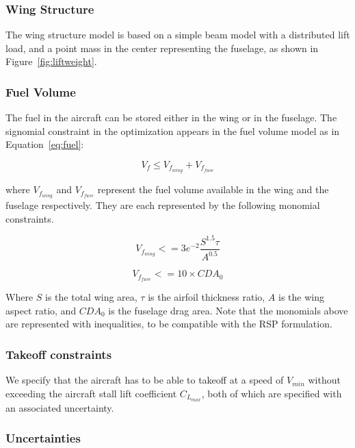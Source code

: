 \subsubsection{Wing Structure}
The wing structure model is based on a simple beam model with a distributed lift load,
and a point mass in the center representing the fuselage, as shown in Figure~\ref{fig:liftweight}.

\subsubsection{Fuel Volume}
The fuel in the aircraft can be stored either in the wing or in the fuselage.
The signomial constraint in the optimization appears in the fuel volume model as in Equation~\ref{eq:fuel}:

\begin{equation}
\label{eq:fuel}
V_f \leq V_{f_{wing}} + V_{f_{fuse}} 
\end{equation}

where $V_{f_{wing}}$ and $V_{f_{fuse}}$ represent the fuel volume available in the wing
and the fuselage respectively. They are each represented by the following monomial constraints.

\begin{equation}
\label{eq:fuelwing}
V_{f_{wing}} <= 3e^{-2}\frac{S^{1.5}\tau}{A^{0.5}}
\end{equation}

\begin{equation}
\label{eq:fuelfuse}
V_{f_{fuse}} <= 10 \times CDA_0
\end{equation}

Where $S$ is the total wing area, $\tau$ is the airfoil thickness ratio, $A$ is the wing aspect ratio, and $CDA_0$ is the fuselage drag area. 
Note that the monomials above are represented with inequalities, to be compatible with the RSP formulation.

\subsubsection{Takeoff constraints}
We specify that the aircraft has to be able to takeoff at a speed of $V_{min}$
without exceeding the aircraft stall lift coefficient $C_{L_{max}}$, both of which are
specified with an associated uncertainty.

\subsubsection{Uncertainties}

